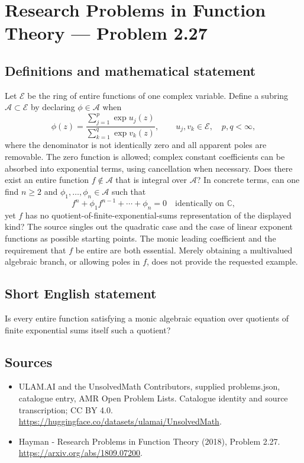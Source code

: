 \documentclass[11pt,a4paper]{article}
\begin{document}
\section*{Research Problems in Function Theory — Problem 2.27}\label{statement}

\subsection{Definitions and mathematical statement}
Let $\mathcal E$ be the ring of entire functions of one complex variable. Define a subring $\mathcal A\subset\mathcal E$ by declaring $\phi\in\mathcal A$ when
\[
\phi(z)=\frac{\sum_{j=1}^{p}\exp u_j(z)}{\sum_{k=1}^{q}\exp v_k(z)},
\qquad u_j,v_k\in\mathcal E,\quad p,q<\infty,
\]
where the denominator is not identically zero and all apparent poles are removable. The zero function is allowed; complex constant coefficients can be absorbed into exponential terms, using cancellation when necessary.
Does there exist an entire function $f\notin\mathcal A$ that is integral over $\mathcal A$? In concrete terms, can one find $n\ge2$ and $\phi_1,\ldots,\phi_n\in\mathcal A$ such that
\[
f^n+\phi_1f^{n-1}+\cdots+\phi_n=0
\quad\text{identically on }\mathbb C,
\]
yet $f$ has no quotient-of-finite-exponential-sums representation of the displayed kind?
The source singles out the quadratic case and the case of linear exponent functions as possible starting points. The monic leading coefficient and the requirement that $f$ be entire are both essential. Merely obtaining a multivalued algebraic branch, or allowing poles in $f$, does not provide the requested example.
\subsection{Short English statement}
Is every entire function satisfying a monic algebraic equation over quotients of finite exponential sums itself such a quotient?
\subsection{Sources}
\begin{itemize}
\item[S1] ULAM.AI and the UnsolvedMath Contributors, supplied problems.json, catalogue entry, AMR Open Problem Lists. Catalogue identity and source transcription; CC BY 4.0.
\url{https://huggingface.co/datasets/ulamai/UnsolvedMath}.
\item[S2] Hayman - Research Problems in Function Theory (2018), Problem 2.27. 
\url{https://arxiv.org/abs/1809.07200}.
\end{itemize}
\end{document}

